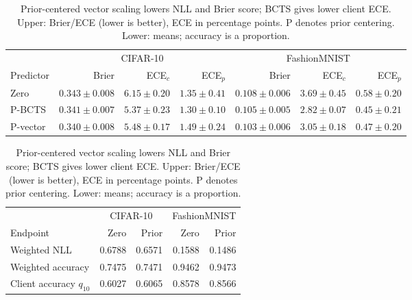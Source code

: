 \begin{table}[!htb]\centering\small\setlength{\tabcolsep}{3.5pt}
\caption{Prior-centered vector scaling lowers NLL and Brier score; BCTS gives lower client ECE. Upper: Brier/ECE (lower is better), ECE in percentage points. P denotes prior centering. Lower: means; accuracy is a proportion.}\label{tab:quality}
\begin{tabular}{@{}lrrrrrr@{}}\toprule
& \multicolumn{3}{c}{CIFAR-10} & \multicolumn{3}{c}{FashionMNIST}\\
Predictor & Brier & ECE$_c$ & ECE$_p$ & Brier & ECE$_c$ & ECE$_p$\\\midrule
Zero & $0.343\pm0.008$ & $6.15\pm0.20$ & $1.35\pm0.41$ & $0.108\pm0.006$ & $3.69\pm0.45$ & $0.58\pm0.20$\\
P-BCTS & $0.341\pm0.007$ & $5.37\pm0.23$ & $1.30\pm0.10$ & $0.105\pm0.005$ & $2.82\pm0.07$ & $0.45\pm0.21$\\
P-vector & $0.340\pm0.008$ & $5.48\pm0.17$ & $1.49\pm0.24$ & $0.103\pm0.006$ & $3.05\pm0.18$ & $0.47\pm0.20$\\\bottomrule
\end{tabular}
\par\medskip
\begin{tabular}{lrrrr}\toprule
& \multicolumn{2}{c}{CIFAR-10} & \multicolumn{2}{c}{FashionMNIST}\\
Endpoint & Zero & Prior & Zero & Prior\\\midrule
Weighted NLL & 0.6788 & 0.6571 & 0.1588 & 0.1486\\
Weighted accuracy & 0.7475 & 0.7471 & 0.9462 & 0.9473\\
Client accuracy $q_{10}$ & 0.6027 & 0.6065 & 0.8578 & 0.8566\\\bottomrule
\end{tabular}
\end{table}
